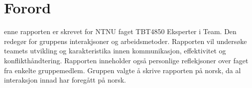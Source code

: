 \section{Forord}

enne rapporten er skrevet for NTNU faget TBT4850 Eksperter i Team. Den redegør for gruppens interakjsoner og arbeidsmetoder. 
Rapporten vil undersøke teamets utvikling og karakteristika innen kommunikasjon, effektivitet og konflikthåndtering. 
Rapporten inneholder også personlige reflekjsoner over faget fra enkelte gruppemedlem. 
Gruppen valgte å skrive rapporten på norsk, da al interaksjon innad har foregått på norsk. 